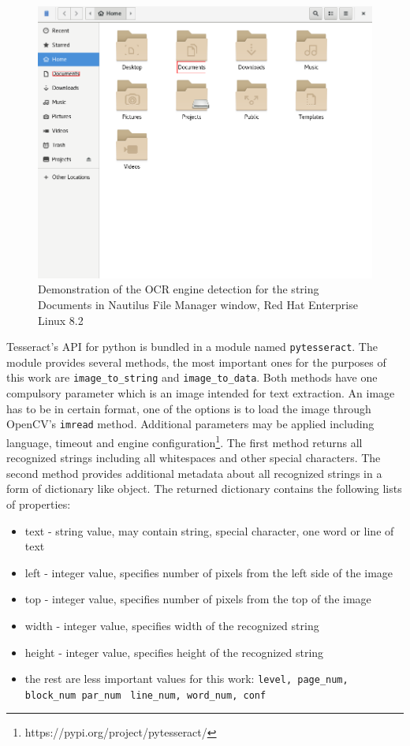 \begin{figure}[hbt]
	\centering
	\includegraphics[width=1\textwidth]{obrazky-figures/ocr+nautilus.png}
	\caption{Demonstration of the OCR engine detection for the string Documents in Nautilus File Manager window, Red Hat Enterprise Linux 8.2}
	\label{ocr_nautilus}
\end{figure}
\bigskip

Tesseract's API for python is bundled in a module named \texttt{pytesseract}. The module provides several methods, the most important ones for the purposes of this work are \verb|image_to_string| and \verb|image_to_data|. Both methods have one compulsory parameter which is an image intended for text extraction. An image has to be in certain format, one of the options is to load the image through OpenCV's \texttt{imread} method. Additional parameters may be applied including language, timeout and engine configuration\footnote{https://pypi.org/project/pytesseract/}. The first method returns all recognized strings including all whitespaces and other special characters. The second method provides additional metadata about all recognized strings in a form of dictionary like object. The returned dictionary contains the following lists of properties:



\begin{itemize}
    \item text - string value, may contain string, special character, one word or line of text
    \item left - integer value, specifies number of pixels from the left side of the image 
    \item top - integer value, specifies number of pixels from the top of the image
    \item width - integer value, specifies width of the recognized string 
    \item height - integer value, specifies height of the recognized string
    \item the rest are less important values for this work: \verb|level, page_num, block_num par_num|
    \verb| line_num, word_num, conf|
\end{itemize}



